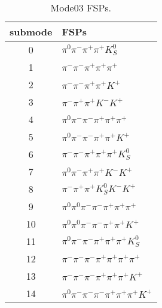 \begin{table}[h!]
\begin{center}
\begin{tabular}{cl}
\hline
submode& FSPs\\
\hline
0 & $\pi^0 \pi^- \pi^+ \pi^+ K_S^0 $ \\
1 & $\pi^- \pi^- \pi^+ \pi^+ \pi^+ $ \\
2 & $\pi^- \pi^- \pi^+ \pi^+ K^+ $ \\
3 & $\pi^- \pi^+ \pi^+ K^- K^+ $ \\
4 & $\pi^0 \pi^- \pi^- \pi^+ \pi^+ \pi^+ $ \\
5 & $\pi^0 \pi^- \pi^- \pi^+ \pi^+ K^+ $ \\
6 & $\pi^- \pi^- \pi^+ \pi^+ \pi^+ K_S^0 $ \\
7 & $\pi^0 \pi^- \pi^+ \pi^+ K^- K^+ $ \\
8 & $\pi^- \pi^+ \pi^+ K_S^0 K^- K^+ $ \\
9 & $\pi^0 \pi^0 \pi^- \pi^- \pi^+ \pi^+ \pi^+ $ \\
10 & $\pi^0 \pi^0 \pi^- \pi^- \pi^+ \pi^+ K^+ $ \\
11 & $\pi^0 \pi^- \pi^- \pi^+ \pi^+ \pi^+ K_S^0 $ \\
12 & $\pi^- \pi^- \pi^- \pi^+ \pi^+ \pi^+ \pi^+ $ \\
13 & $\pi^- \pi^- \pi^- \pi^+ \pi^+ \pi^+ K^+ $ \\
14 & $\pi^0 \pi^- \pi^- \pi^- \pi^+ \pi^+ \pi^+ K^+ $ \\
\hline
\end{tabular}
\label{tab:Mode03FSPs}
\caption{Mode03 FSPs.}
\end{center}
\end{table}
